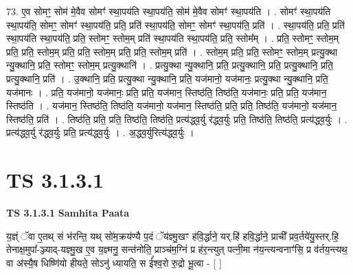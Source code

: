 \documentclass[17pt]{extarticle}
\begin{document}
73. ए॒व सोमꣳ॒॒ सोम॑ मे॒वैव सोमꣳ॑ स्था॒पय॑ति स्था॒पय॑ति॒ सोम॑ मे॒वैव सोमꣳ॑ स्था॒पय॑ति । . सोमꣳ॑ स्था॒पय॑ति स्था॒पय॑ति॒ सोमꣳ॒॒ सोमꣳ॑ स्था॒पय॑ति॒ प्रति॒ प्रति॑ स्था॒पय॑ति॒ सोमꣳ॒॒ सोमꣳ॑ स्था॒पय॑ति॒ प्रति॑ । . स्था॒पय॑ति॒ प्रति॒ प्रति॑ स्था॒पय॑ति स्था॒पय॑ति॒ प्रति॒ स्तोमꣳ॒॒ स्तोम॒म् प्रति॑ स्था॒पय॑ति स्था॒पय॑ति॒ प्रति॒ स्तोम᳚म् । . प्रति॒ स्तोमꣳ॒॒ स्तोम॒म् प्रति॒ प्रति॒ स्तोम॒म् प्रति॒ प्रति॒ स्तोम॒म् प्रति॒ प्रति॒ स्तोम॒म् प्रति॑ । . स्तोम॒म् प्रति॒ प्रति॒ स्तोमꣳ॒॒ स्तोम॒म् प्रत्यु॒क्था न्यु॒क्थानि॒ प्रति॒ स्तोमꣳ॒॒ स्तोम॒म् प्रत्यु॒क्थानि॑ । . प्रत्यु॒क्था न्यु॒क्थानि॒ प्रति॒ प्रत्यु॒क्थानि॒ प्रति॒ प्रत्यु॒क्थानि॒ प्रति॒ प्रत्यु॒क्थानि॒ प्रति॑ । . उ॒क्थानि॒ प्रति॒ प्रत्यु॒क्था न्यु॒क्थानि॒ प्रति॒ यज॑मानो॒ यज॑मानः॒ प्रत्यु॒क्था न्यु॒क्थानि॒ प्रति॒ यज॑मानः । . प्रति॒ यज॑मानो॒ यज॑मानः॒ प्रति॒ प्रति॒ यज॑मान॒ स्तिष्ठ॑ति॒ तिष्ठ॑ति॒ यज॑मानः॒ प्रति॒ प्रति॒ यज॑मान॒ स्तिष्ठ॑ति । . यज॑मान॒ स्तिष्ठ॑ति॒ तिष्ठ॑ति॒ यज॑मानो॒ यज॑मान॒ स्तिष्ठ॑ति॒ प्रति॒ प्रति॒ तिष्ठ॑ति॒ यज॑मानो॒ यज॑मान॒ स्तिष्ठ॑ति॒ प्रति॑ । . तिष्ठ॑ति॒ प्रति॒ प्रति॒ तिष्ठ॑ति॒ तिष्ठ॑ति॒ प्रत्य॑द्ध्व॒र्यु र॑द्ध्व॒र्युः प्रति॒ तिष्ठ॑ति॒ तिष्ठ॑ति॒ प्रत्य॑द्ध्व॒र्युः । . प्रत्य॑द्ध्व॒र्यु र॑द्ध्व॒र्युः प्रति॒ प्रत्य॑द्ध्व॒र्युः । . अ॒द्ध्व॒र्युरित्य॑द्ध्व॒र्युः । \newline
\pagebreak
{}

\section{ TS 3.1.3.1 }

\textbf{TS 3.1.3.1 } \newline
\textbf{Samhita Paata} \newline

य॒ज्ञ्ं ॅवा ए॒तथ् सं भ॑रन्ति॒ यथ् सो॑म॒क्रय॑ण्यै प॒दं ॅय॑ज्ञ्मु॒खꣳ ह॑वि॒र्द्धाने॒ यर्.हि॑ हवि॒र्द्धाने॒ प्राची᳚ प्रव॒र्तये॑यु॒स्तर्.हि॒ तेनाक्ष॒मुपा᳚-ञ्ज्याद्-यज्ञ्मु॒ख ए॒व य॒ज्ञ्मनु॒ सन्त॑नोति॒ प्राञ्च॑म॒ग्निं प्र ह॑र॒न्त्युत् पत्नी॒मा न॑य॒न्त्यन्वनाꣳ॑सि॒ प्र व॑र्तय॒न्त्यथ॒ वा अ॑स्यै॒ष धिष्णि॑यो हीयते॒ सोऽनु॑ ध्यायति॒ स ई᳚श्व॒रो रु॒द्रो भू॒त्वा - [  ] \newline
\end{document}
